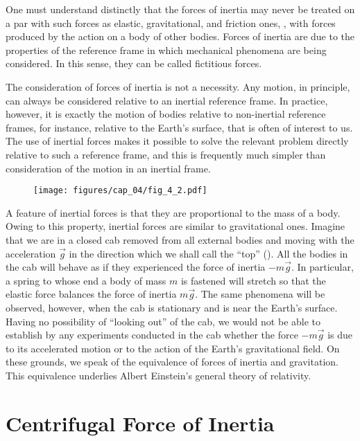 One must understand distinctly that the forces of inertia may never be treated on a par with such forces as elastic, gravitational, and friction ones, \ie, with forces produced by the action on a body of other bodies. Forces of inertia are due to the properties of the reference frame in which mechanical phenomena are being considered. In this sense, they can be called fictitious forces.

The consideration of forces of inertia is not a necessity. Any motion, in principle, can always be considered relative to an inertial reference frame. In practice, however, it is exactly the motion of bodies relative to non-inertial reference frames, for instance, relative to the Earth's surface, that is often of interest to us. The use of inertial forces makes it possible to solve the relevant problem directly relative to such a reference frame, and this is frequently much simpler than consideration of the motion in an inertial frame.

\begin{figure}[t]
	\begin{center}
		\texttt{[image: figures/cap\_04/fig\_4\_2.pdf]}
		\caption[]{}
		\label{fig:4_2}
	\end{center}
\vspace{-0.2cm}
\end{figure}

A feature of inertial forces is that they are proportional to the mass of a body. Owing to this property, inertial forces are similar to gravitational ones. Imagine that we are in a closed cab removed from all external bodies and moving with the acceleration $\vec{g}$ in the direction which we shall call the ``top'' (). All the bodies in the cab will behave as if they experienced the force of inertia $-m\vec{g}$. In particular, a spring to whose end a body of mass $m$ is fastened will stretch so that the elastic force balances the force of inertia $m\vec{g}$. The same phenomena will be observed, however, when the cab is stationary and is near the Earth's surface. Having no possibility of ``looking out'' of the cab, we would not be able to establish by any experiments conducted in the cab whether the force $-m\vec{g}$ is due to its accelerated motion or to the action of the Earth's gravitational field. On these grounds, we speak of the equivalence of forces of inertia and gravitation. This equivalence underlies Albert Einstein's general theory of relativity.

\section{Centrifugal Force of Inertia}\label{sec:4_2}

